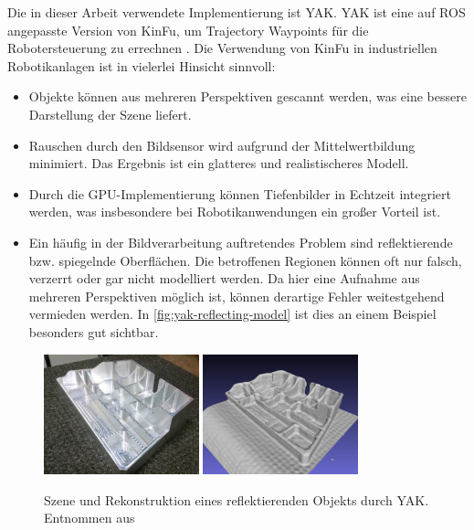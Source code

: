 Die in dieser Arbeit verwendete Implementierung ist \ac{YAK}.
\ac{YAK} ist eine auf \ac{ROS} angepasste Version von \ac{KinFu}, um Trajectory Waypoints für die Robotersteuerung zu errechnen \cite{schornak2019yak}.
Die Verwendung von \ac{KinFu} in industriellen Robotikanlagen ist in vielerlei Hinsicht sinnvoll:
\begin{itemize}
\item Objekte können aus mehreren Perspektiven gescannt werden, was eine bessere Darstellung der Szene liefert.
\item Rauschen durch den Bildsensor wird aufgrund der Mittelwertbildung minimiert.
Das Ergebnis ist ein glatteres und realistischeres Modell.
\item Durch die GPU-Implementierung können Tiefenbilder in Echtzeit integriert werden, was insbesondere bei Robotikanwendungen ein großer Vorteil ist.
\item Ein häufig in der Bildverarbeitung auftretendes Problem sind reflektierende bzw. spiegelnde Oberflächen.
Die betroffenen Regionen können oft nur falsch, verzerrt oder gar nicht modelliert werden.
Da hier eine Aufnahme aus mehreren Perspektiven möglich ist, können derartige Fehler weitestgehend vermieden werden. In \autoref{fig:yak-reflecting-model} ist dies an einem Beispiel besonders gut sichtbar.
\end{itemize}

\begin{figure}[ht]
	\centering
	\includegraphics[width=0.4\textwidth]{images/yak-reflecting-scene.jpg}
	\includegraphics[width=0.4\textwidth]{images/yak-reflecting-reconstruction.png}
	\caption{Szene und Rekonstruktion eines reflektierenden Objekts durch \ac{YAK}. Entnommen aus \cite{schornak2019yak}}
	\label{fig:yak-reflecting-model}
\end{figure}

